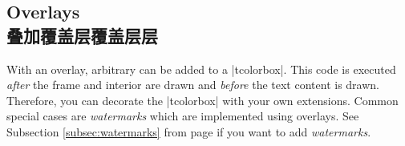 \setcounter{section}{4}
\setcounter{subsection}{11} 
\setcounter{subsubsection}{0}















% 



\subsection{Overlays\\叠加覆盖层覆盖层层}\label{subsec:overlays}

With an overlay, arbitrary  can be added to a
 |tcolorbox|. This code is executed \emph{after} the frame and interior are
 drawn and \emph{before} the text content is drawn. Therefore, you can
 decorate the |tcolorbox| with your own extensions.
 Common special cases are \emph{watermarks} which are implemented using overlays.
 See Subsection \ref{subsec:watermarks} from page \pageref{subsec:watermarks} if
 you want to add \emph{watermarks}.

